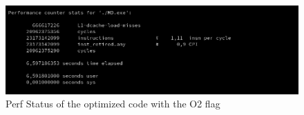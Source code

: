 \documentclass[conference]{IEEEtran}
\begin{document}
\begin{figure}[htbp]
\includegraphics[scale=0.6]{images/Good_code_O2.png}
\caption{Perf Status of the optimized code with the O2 flag}
\label{fig}
\end{figure}
\end{document}
